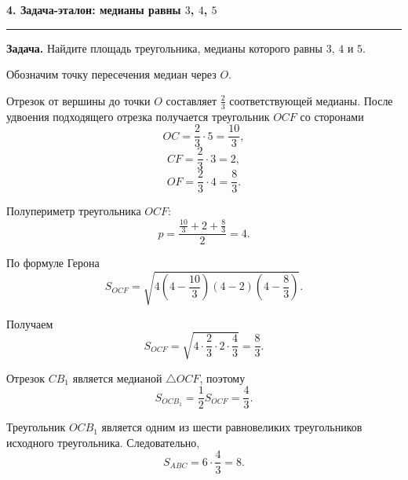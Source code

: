 \documentclass[a4paper,12pt]{article}
\newcommand{\checksection}[1]{%
  \vspace{0.7em}%
  {\Large\bfseries\color{darkaccent}#1}\par
  \vspace{0.25em}
  {\color{rulegray}\rule{\linewidth}{0.6pt}}\par
  \vspace{0.5em}
}
\newcommand{\SABC}{S_{ABC}}
\begin{document}

\checksection{4. Задача-эталон: медианы равны $3$, $4$, $5$}

\textbf{Задача.}
Найдите площадь треугольника, медианы которого равны
$3$, $4$ и $5$.

Обозначим точку пересечения медиан через $O$.

Отрезок от вершины до точки $O$ составляет $\frac23$
соответствующей медианы. После удвоения подходящего отрезка
получается треугольник $OCF$ со сторонами
\[
OC=\frac23\cdot5=\frac{10}{3},
\]
\[
CF=\frac23\cdot3=2,
\]
\[
OF=\frac23\cdot4=\frac83.
\]

\begin{center}
\end{center}

Полупериметр треугольника $OCF$:
\[
p=
\frac{
\frac{10}{3}+2+\frac83
}{2}
=4.
\]

По формуле Герона
\[
S_{OCF}
=
\sqrt{
4
\left(4-\frac{10}{3}\right)
(4-2)
\left(4-\frac83\right)
}.
\]

Получаем
\[
S_{OCF}
=
\sqrt{
4\cdot
\frac23\cdot
2\cdot
\frac43
}
=
\frac83.
\]

Отрезок $CB_1$ является медианой $\triangle OCF$, поэтому
\[
S_{OCB_1}
=
\frac12S_{OCF}
=
\frac43.
\]

Треугольник $OCB_1$ является одним из шести равновеликих
треугольников исходного треугольника. Следовательно,
\[
\SABC
=
6\cdot\frac43
=
\boxed{8}.
\]

\end{document}
